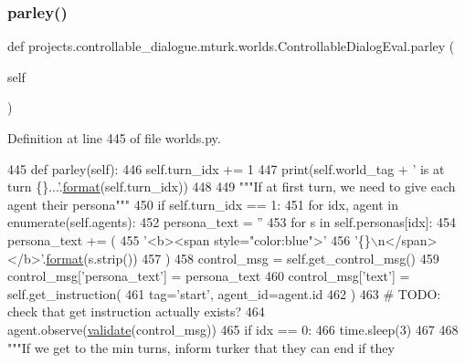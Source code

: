 \subsubsection{\texorpdfstring{parley()}{parley()}}
{\footnotesize\ttfamily def projects.\+controllable\+\_\+dialogue.\+mturk.\+worlds.\+Controllable\+Dialog\+Eval.\+parley (\begin{DoxyParamCaption}\item[{}]{self }\end{DoxyParamCaption})}



Definition at line 445 of file worlds.\+py.


\begin{DoxyCode}
445     \textcolor{keyword}{def }parley(self):
446         self.turn\_idx += 1
447         print(self.world\_tag + \textcolor{stringliteral}{' is at turn \{\}...'}.\hyperlink{namespaceparlai_1_1chat__service_1_1services_1_1messenger_1_1shared__utils_a32e2e2022b824fbaf80c747160b52a76}{format}(self.turn\_idx))
448 
449         \textcolor{stringliteral}{"""If at first turn, we need to give each agent their persona"""}
450         \textcolor{keywordflow}{if} self.turn\_idx == 1:
451             \textcolor{keywordflow}{for} idx, agent \textcolor{keywordflow}{in} enumerate(self.agents):
452                 persona\_text = \textcolor{stringliteral}{''}
453                 \textcolor{keywordflow}{for} s \textcolor{keywordflow}{in} self.personas[idx]:
454                     persona\_text += (
455                         \textcolor{stringliteral}{'<b><span style="color:blue">'}
456                         \textcolor{stringliteral}{'\{\}\(\backslash\)n</span></b>'}.\hyperlink{namespaceparlai_1_1chat__service_1_1services_1_1messenger_1_1shared__utils_a32e2e2022b824fbaf80c747160b52a76}{format}(s.strip())
457                     )
458                 control\_msg = self.get\_control\_msg()
459                 control\_msg[\textcolor{stringliteral}{'persona\_text'}] = persona\_text
460                 control\_msg[\textcolor{stringliteral}{'text'}] = self.get\_instruction(
461                     tag=\textcolor{stringliteral}{'start'}, agent\_id=agent.id
462                 )
463                 \textcolor{comment}{# TODO: check that get instruction actually exists?}
464                 agent.observe(\hyperlink{namespaceparlai_1_1core_1_1worlds_afc3fad603b7bce41dbdc9cdc04a9c794}{validate}(control\_msg))
465                 \textcolor{keywordflow}{if} idx == 0:
466                     time.sleep(3)
467 
468         \textcolor{stringliteral}{"""If we get to the min turns, inform turker that they can end if they}

\end{DoxyCode}
